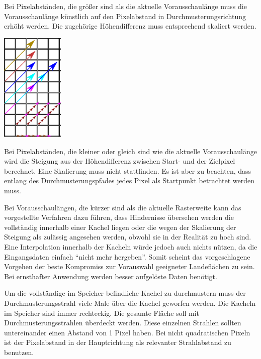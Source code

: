 \documentclass[
11pt, %
a4paper, %
oneside, %
pdfspacing, %
headinclude,
BCOR5mm, %
ngerman, %
bibtotocnumbered,
]{scrartcl}
\begin{document}
	Bei Pixelabständen, die größer sind als die aktuelle Vorausschaulänge muss die Vorausschaulänge künstlich auf den Pixelabstand in Durchmusterungsrichtung erhöht werden. Die zugehörige Höhendifferenz muss entsprechend skaliert werden. 
	
	 	\begin{minipage}{\textwidth}
		\skippingparagraph
		
		\begin{minipage}[t]{3cm}
			\vspace{0pt}
			\centering
			\includegraphics[width=3cm]{./drawings/Vorausschaulaengen.png}
		\end{minipage}
			\begin{minipage}[t]{\textwidth-3cm}
				\vspace{0pt}
				Bei Pixelabständen, die kleiner oder gleich sind wie die aktuelle Vorausschaulänge wird die Steigung aus der Höhendifferenz zwischen Start- und der Zielpixel berechnet. Eine Skalierung muss nicht stattfinden. Es ist aber zu beachten, dass entlang des Durchmusterungspfades jedes Pixel als Startpunkt betrachtet werden muss.			
		\end{minipage}\skippingparagraph
	\end{minipage}

	Bei Vorausschaulängen, die kürzer sind als die aktuelle Rasterweite kann das vorgestellte Verfahren dazu führen, dass Hindernisse übersehen werden die vollständig innerhalb einer Kachel liegen oder die wegen der Skalierung der Steigung als zulässig angesehen werden, obwohl sie in der Realität zu hoch sind. Eine Interpolation innerhalb der Kacheln würde jedoch auch nichts nützen, da die Eingangsdaten einfach "`nicht mehr hergeben"'. Somit scheint das vorgeschlagene Vorgehen der beste Kompromiss zur Vorauswahl geeigneter Landeflächen zu sein. Bei ernsthafter Anwendung werden besser aufgelöste Daten benötigt.
	
	\skippingparagraph
	
	Um die vollständige im Speicher befindliche Kachel zu durchmustern muss der Durchmusterungsstrahl viele Male über die Kachel geworfen werden. Die Kacheln im Speicher sind immer rechteckig. Die gesamte Fläche soll mit Durchmusterungsstrahlen überdeckt werden. Diese einzelnen Strahlen sollten untereinander einen Abstand von 1 Pixel haben. Bei nicht quadratischen Pixeln ist der Pixelabstand in der Hauptrichtung als relevanter Strahlabstand zu benutzen.
	
\end{document}
